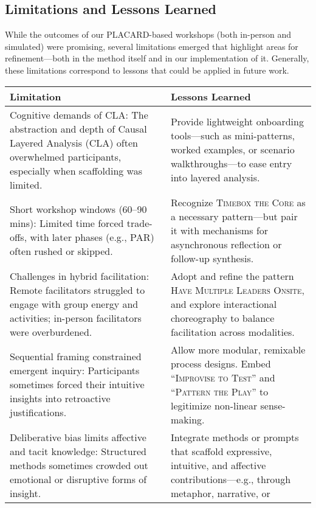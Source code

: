 \documentclass[acmlarge,timestamp]{acmart}
\begin{document}
\subsection{Limitations and Lessons Learned}

While the outcomes of our PLACARD-based workshops (both in-person and
simulated) were promising, several limitations emerged that highlight
areas for refinement---both in the method itself and in our
implementation of it.  Generally, these limitations correspond to
lessons that could be applied in future work.

\begin{longtable}[]{@{}p{}p{}@{}}
\toprule\noalign{}
\endhead
\bottomrule\noalign{}
\endlastfoot
{Limitation} & {Lessons Learned} \\ \hline
{Cognitive demands of CLA}{: The abstraction and depth of Causal Layered
Analysis (CLA) often overwhelmed participants, especially when
scaffolding was limited.}
& {Provide lightweight onboarding tools---such
as mini-patterns, worked examples, or scenario walkthroughs---to ease
entry into layered analysis.} \\ \hline
{Short workshop windows (60--90 mins)}{: Limited time forced trade-offs,
with later phases (e.g., PAR) often rushed or skipped.}
& {Recognize
{\scshape{Timebox the Core}} as a necessary pattern---but pair it with mechanisms
for asynchronous reflection or follow-up synthesis.} \\ \hline
{Challenges in hybrid facilitation}{: Remote facilitators struggled to
  engage with group energy and activities; in-person facilitators were
  overburdened.}
& {Adopt and refine the pattern } {\scshape{Have Multiple Leaders
    Onsite}}{, and explore interactional choreography to balance
  facilitation across modalities.} \\ \hline
{Sequential framing constrained emergent inquiry}{: Participants
  sometimes forced their intuitive insights into retroactive
  justifications.}
& {Allow more modular, remixable process designs. Embed
``{\scshape{Improvise to Test}}'' and ``{\scshape{Pattern the Play}}'' to legitimize non-linear
sense-making.} \\ \hline
{Deliberative bias limits affective and tacit knowledge}{: Structured
methods sometimes crowded out emotional or disruptive forms of insight.}
& {Integrate methods or prompts that scaffold expressive, intuitive, and
affective contributions---e.g., through metaphor, narrative, or
}
\end{longtable}
\end{document}

